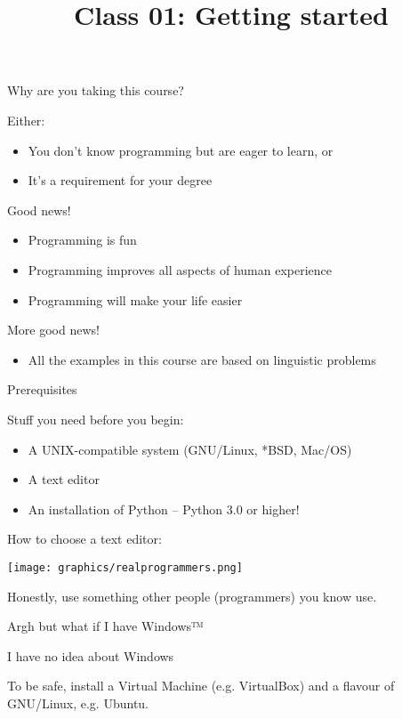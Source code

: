 \documentclass[10pt, compress]{beamer}
\title{Class 01: Getting started }
\begin{document}
\maketitle

\begin{frame}{Why are you taking this course?}

Either:
\begin{itemize}
  \item You don't know programming but are eager to learn, or
  \item It's a requirement for your degree
\end{itemize}

Good news!
\begin{itemize}
  \item Programming is fun
  \item Programming improves all aspects of human experience
  \item Programming will make your life easier
\end{itemize}

More good news! 
\begin{itemize}
  \item All the examples in this course are based on linguistic problems
\end{itemize}

\end{frame}

\begin{frame}{Prerequisites}

Stuff you need before you begin:
\begin{itemize}
 \item A UNIX-compatible system (GNU/Linux, *BSD, Mac/OS)
 \item A text editor
 \item An installation of Python -- Python 3.0 or higher!
\end{itemize}

How to choose a text editor:

\begin{center}
  \texttt{[image: graphics/realprogrammers.png]}
\end{center}

Honestly, use something other people (programmers) you know use.

\end{frame}

\begin{frame}{Argh but what if I have Windows™}

\begin{center}
I have no idea about Windows
\end{center}

To be safe, install a Virtual Machine (e.g. VirtualBox) and a flavour
of GNU/Linux, e.g. Ubuntu.

\end{frame}
\end{document}
